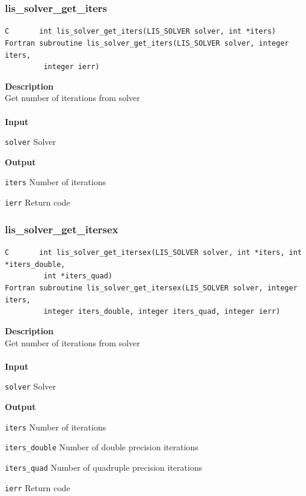 \documentclass[a4paper]{article}
\newcommand{\namelistlabel}[1]{\mbox{#1}\hfill}
\newenvironment{namelist}[1]{%
 \begin{list}{}
  {\let\makelabel\namelistlabel
  \settowidth{\labelwidth}{#1}
  \setlength{\leftmargin}{1.1\labelwidth}}
}{%
\end{list}}
\begin{document}
  \subsubsection{lis\_solver\_get\_iters}
\begin{screen}
\verb|C       int lis_solver_get_iters(LIS_SOLVER solver, int *iters)|\\
\verb|Fortran subroutine lis_solver_get_iters(LIS_SOLVER solver, integer iters,|\\
\verb|         integer ierr)|
\end{screen}
{\bf Description}\\
\indent
Get number of iterations from solver
\\ \\
\noindent
{\bf Input}
\begin{namelist}{XXXXXXXXXXXXXXXXXXXX}
\item[\tt solver] Solver
\end{namelist}
{\bf Output}
\begin{namelist}{XXXXXXXXXXXXXXXXXXXX}
\item[\tt iters] Number of iterations
\item[\tt ierr] Return code
\end{namelist}
\newpage
  \subsubsection{lis\_solver\_get\_itersex}
\begin{screen}
\verb|C       int lis_solver_get_itersex(LIS_SOLVER solver, int *iters, int *iters_double,|\\
\verb|         int *iters_quad)|\\
\verb|Fortran subroutine lis_solver_get_itersex(LIS_SOLVER solver, integer iters,|\\
\verb|         integer iters_double, integer iters_quad, integer ierr)|
\end{screen}
{\bf Description}\\
\indent
Get number of iterations from solver
\\ \\
\noindent
{\bf Input}
\begin{namelist}{XXXXXXXXXXXXXXXXXXXX}
\item[\tt solver] Solver
\end{namelist}
{\bf Output}
\begin{namelist}{XXXXXXXXXXXXXXXXXXXX}
\item[\tt iters] Number of iterations
\item[\tt iters\_double] Number of double precision iterations
\item[\tt iters\_quad] Number of quadruple precision iterations
\item[\tt ierr] Return code
\end{namelist}
\end{document}
